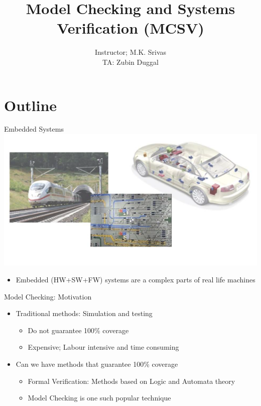 \documentclass{beamer}
\title{Model Checking and Systems Verification (MCSV)}
\author{Instructor; M.K. Srivas \\
TA: Zubin Duggal}
\begin{document}
\begin{frame}
  \titlepage
\end{frame}


\section{Outline}

\begin{frame}{Embedded Systems}
\includegraphics[scale=0.4]{pics/motivpic.png}
\begin{itemize}
\item Embedded (HW+SW+FW) systems are a complex parts of real life machines
\end{itemize}
\end{frame}

\begin{frame}{Model Checking: Motivation}
\begin{itemize}
\item <1-> Traditional methods: Simulation and testing
\begin{itemize}
\item <2-> Do not guarantee 100\% coverage
\item<3-> Expensive; Labour intensive and time consuming
\end{itemize}

\item<4->Can we have methods that guarantee 100\% coverage
\begin{itemize}
\item<5->Formal Verification: Methods based on Logic and Automata theory
\item<6-> Model Checking is one such popular technique
\end{itemize}
\end{itemize}
\end{frame}
\end{document}
